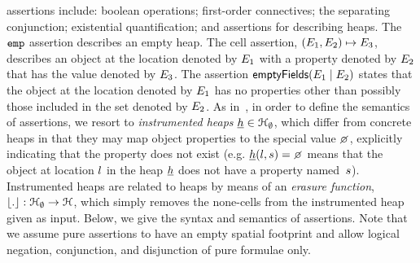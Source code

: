 \jsil assertions include: boolean operations; first-order connectives; the separating conjunction; 
existential quantification; and assertions for describing heaps. The $\texttt{emp}$ assertion describes 
an empty heap. The cell assertion, $(E_1,E_2) \mapsto E_3$,  describes an object 
at the location denoted by $E_1$ with a property denoted by $E_2$ that has the value 
denoted by $E_3$. The assertion $\mathsf{emptyFields}(E_1 \mid E_2)$ states that the object at 
the location denoted by $E_1$ has no properties other than possibly those included in the
set denoted by $E_2$. 
%
As in~\cite{gardner:popl:2012,javert}, in order to define the semantics of assertions, 
we resort to \emph{instrumented heaps} $\underline{h} \in {\mathcal H}_\emptyset$, which differ from 
concrete heaps in that they may map object properties to the special value $\none$, 
explicitly indicating that the property does not exist (e.g. $\iheap(\loc, \jstring) = \none$
means that the object at location $l$ in the heap $\underline{h}$ does not have a property
named~$s$). 
Instrumented heaps are related to heaps by means of an \emph{erasure 
function}, $\lfloor . \rfloor: {\mathcal H}_\emptyset \rightarrow {\mathcal H}$, %
which simply removes the none-cells from the instrumented heap given as input.  Below, we give the syntax and semantics of \jsil assertions. Note that we assume pure assertions to have an empty spatial footprint and allow logical negation, conjunction, and disjunction of pure formulae only.


